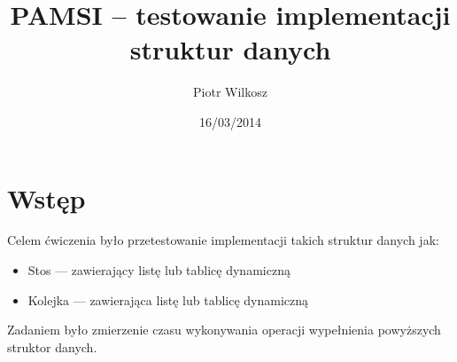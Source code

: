 \documentclass[a4paper,11pt]{article}
\date{16/03/2014}
\title{PAMSI -- testowanie implementacji struktur danych}
\author{Piotr Wilkosz}
\begin{document}
\maketitle

\section{Wstęp}
Celem ćwiczenia było przetestowanie implementacji takich struktur danych jak:
  \begin{itemize}
   \item Stos --- zawierający listę lub tablicę dynamiczną
   \item Kolejka --- zawierająca listę lub tablicę dynamiczną
  \end{itemize}
Zadaniem było zmierzenie czasu wykonywania operacji wypełnienia powyższych struktor danych.
\end{document}
